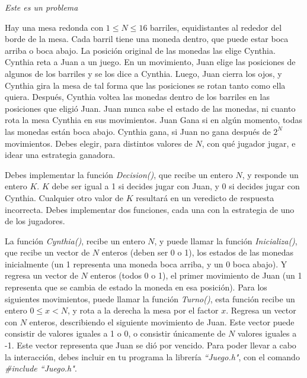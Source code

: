 \documentclass[12pt]{scrartcl}
\begin{document}
    
    {\itshape Este es un problema}
    
    \vspace{10pt}

    
    Hay una mesa redonda con $1 \le N \le 16$ barriles, equidistantes al rededor del borde de la mesa. Cada barril tiene una moneda dentro, que puede estar boca arriba o boca abajo. La posición original de las monedas las elige Cynthia. Cynthia reta a Juan a un juego. En un movimiento, Juan elige las posiciones de algunos de los barriles y se los dice a Cynthia. Luego, Juan cierra los ojos, y Cynthia gira la mesa de tal forma que las posiciones se rotan tanto como ella quiera. Después, Cynthia voltea las monedas dentro de los barriles en las posiciones que eligió Juan. Juan nunca sabe el estado de las monedas, ni cuanto rota la mesa Cynthia en sus movimientos. Juan Gana si en algún momento, todas las monedas están boca abajo. Cynthia gana, si Juan no gana después de $2^N$ movimientos. 
    Debes elegir, para distintos valores de $N$, con qué jugador jugar, e idear una estrategia ganadora.


    Debes implementar la función \textit{Decision()}, que recibe un entero $N$, y responde un entero $K$. $K$ debe ser igual a 1 si decides jugar con Juan, y $0$ si decides jugar con Cynthia. Cualquier otro valor de $K$ resultará en un veredicto de respuesta incorrecta. Debes implementar dos funciones, cada una con la estrategia de uno de los jugadores. 
    
    La función \textit{Cynthia()}, recibe un entero $N$, y puede llamar la función \textit{Inicializa()}, que recibe un vector de  $N$ enteros (deben ser 0 o 1), los estados de las monedas inicialmente (un 1 representa una moneda boca arriba, y un 0 boca abajo). Y regresa un vector de $N$ enteros (todos 0 o 1), el primer movimiento de Juan (un 1 representa que se cambia de estado la moneda en esa posición). Para los siguientes movimientos, puede llamar la función \textit{Turno()}, esta función recibe un entero $0 \le x < N$, y rota a la derecha la mesa por el factor $x$. Regresa un vector con $N$ enteros, describiendo el siguiente movimiento de Juan. Este vector puede consistir de valores iguales a 1 o 0, o consistir únicamente de $N$ valores iguales a -1. Este vector representa que Juan se dió por vencido. Para poder llevar a cabo la interacción, debes incluir en tu programa la librería \textit{``Juego.h"}, con el comando \textit{\#include ``Juego.h"}.
\end{document}
